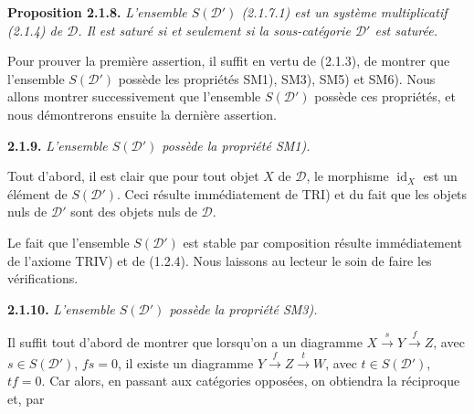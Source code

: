 \medskip
\noindent\textbf{Proposition 2.1.8.}\quad
{}
\emph{L'ensemble $S(\mathcal D')$ (2.1.7.1) est un système multiplicatif
(2.1.4) de $\mathcal D$. Il est saturé si et seulement si la sous-catégorie
$\mathcal D'$ est saturée.}

Pour prouver la première assertion, il suffit en vertu de (2.1.3), de montrer
que l'ensemble $S(\mathcal D')$ possède les propriétés SM1), SM3), SM5) et
SM6). Nous allons montrer successivement que l'ensemble $S(\mathcal D')$
possède ces propriétés, et nous démontrerons ensuite la dernière assertion.

\medskip
\noindent\textbf{2.1.9.}\quad
{}
\emph{L'ensemble $S(\mathcal D')$ possède la propriété SM1).}

Tout d'abord, il est clair que pour tout objet $X$ de $\mathcal D$, le
morphisme $\operatorname{id}_X$ est un élément de $S(\mathcal D')$. Ceci
résulte immédiatement de TRI) et du fait que les objets nuls de $\mathcal D'$
sont des objets nuls de $\mathcal D$.

Le fait que l'ensemble $S(\mathcal D')$ est stable par composition résulte
immédiatement de l'axiome TRIV) et de (1.2.4). Nous laissons au lecteur le soin
de faire les vérifications.

\medskip
\noindent\textbf{2.1.10.}\quad
{}
\emph{L'ensemble $S(\mathcal D')$ possède la propriété SM3).}

Il suffit tout d'abord de montrer que lorsqu'on a un diagramme
$X\xrightarrow{s}Y\xrightarrow{f}Z$, avec $s\in S(\mathcal D')$, $fs=0$, il
existe un diagramme $Y\xrightarrow{f}Z\xrightarrow{t}W$, avec
$t\in S(\mathcal D')$, $tf=0$. Car alors, en passant aux catégories opposées,
on obtiendra la réciproque et, par

\endgroup
